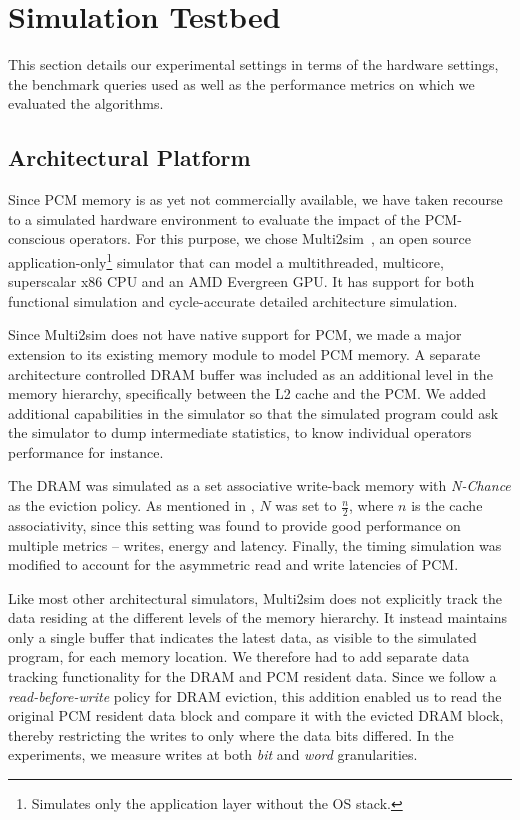 \section{Simulation Testbed}
This section details our experimental settings in terms of the hardware settings, the benchmark queries used as well as the performance metrics on which we evaluated the algorithms.

\label{sec:exp}
\subsection{Architectural Platform}
Since PCM memory is as yet not commercially available, we
have taken recourse to a simulated hardware environment to
evaluate the impact of the PCM-conscious operators.  For this
purpose, we chose Multi2sim~\cite{multi2sim}, an open source
application-only\footnote{Simulates only the application layer without
the OS stack.} simulator that can model a multithreaded, multicore,
superscalar x86 CPU and an AMD Evergreen GPU. It has support for both
functional simulation and cycle-accurate detailed architecture simulation.

Since Multi2sim does not have native support for PCM, we made a major extension to its existing memory module to model PCM memory. A separate architecture
controlled DRAM buffer was included as an additional level in the memory
hierarchy, specifically between the L2 cache and the PCM. We added additional capabilities in the simulator so that the simulated program could ask the simulator to dump intermediate statistics, to know individual operators performance for instance. 

The DRAM was simulated as a set associative write-back memory with \textit{N-Chance}
as the eviction policy. As mentioned in \cite{nchance}, $N$ was set
to $\frac{n}{2}$, where $n$ is the cache associativity, since this
setting was found to provide good performance on multiple metrics -- writes, energy
and latency.  Finally, the timing simulation was modified to account
for the asymmetric read and write latencies of PCM.


\begin{comment}
Since our experiments consider J
In our experiments, we have used $n$ to be 8, therefore making $N$ to be 4.
\end{comment}

Like most other architectural simulators, Multi2sim does not
explicitly track the data residing at the different levels of the
memory hierarchy. It instead maintains only a single buffer that
indicates the latest data, as visible to the simulated program, for
each memory location. We therefore had to add separate data tracking
functionality for the DRAM and PCM resident data. Since we follow
a \textit{read-before-write} policy for DRAM eviction, this addition
enabled us to read the original PCM resident data block and compare
it with the evicted DRAM block, thereby restricting the writes to only
where the data bits differed. In the experiments, we measure writes at
both \textit{bit} and \textit{word} granularities.

